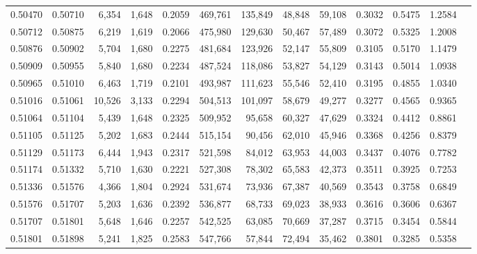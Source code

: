 \begin{tabular}{rrrrrrrrrrrrr}
0.50470 & 0.50710 &  6,354 & 1,648 &                                     0.2059 & 469,761 & 135,849 &  48,848 &  59,108 & 0.3032 & 0.5475 & 1.2584 \\
0.50712 & 0.50875 &  6,219 & 1,619 &                                     0.2066 & 475,980 & 129,630 &  50,467 &  57,489 & 0.3072 & 0.5325 & 1.2008 \\
0.50876 & 0.50902 &  5,704 & 1,680 &                                     0.2275 & 481,684 & 123,926 &  52,147 &  55,809 & 0.3105 & 0.5170 & 1.1479 \\
0.50909 & 0.50955 &  5,840 & 1,680 &                                     0.2234 & 487,524 & 118,086 &  53,827 &  54,129 & 0.3143 & 0.5014 & 1.0938 \\
0.50965 & 0.51010 &  6,463 & 1,719 &                                     0.2101 & 493,987 & 111,623 &  55,546 &  52,410 & 0.3195 & 0.4855 & 1.0340 \\
0.51016 & 0.51061 & 10,526 & 3,133 &                                     0.2294 & 504,513 & 101,097 &  58,679 &  49,277 & 0.3277 & 0.4565 & 0.9365 \\
0.51064 & 0.51104 &  5,439 & 1,648 &                                     0.2325 & 509,952 &  95,658 &  60,327 &  47,629 & 0.3324 & 0.4412 & 0.8861 \\
0.51105 & 0.51125 &  5,202 & 1,683 &                                     0.2444 & 515,154 &  90,456 &  62,010 &  45,946 & 0.3368 & 0.4256 & 0.8379 \\
0.51129 & 0.51173 &  6,444 & 1,943 &                                     0.2317 & 521,598 &  84,012 &  63,953 &  44,003 & 0.3437 & 0.4076 & 0.7782 \\
0.51174 & 0.51332 &  5,710 & 1,630 &                                     0.2221 & 527,308 &  78,302 &  65,583 &  42,373 & 0.3511 & 0.3925 & 0.7253 \\
0.51336 & 0.51576 &  4,366 & 1,804 &                                     0.2924 & 531,674 &  73,936 &  67,387 &  40,569 & 0.3543 & 0.3758 & 0.6849 \\
0.51576 & 0.51707 &  5,203 & 1,636 &                                     0.2392 & 536,877 &  68,733 &  69,023 &  38,933 & 0.3616 & 0.3606 & 0.6367 \\
0.51707 & 0.51801 &  5,648 & 1,646 &                                     0.2257 & 542,525 &  63,085 &  70,669 &  37,287 & 0.3715 & 0.3454 & 0.5844 \\
0.51801 & 0.51898 &  5,241 & 1,825 &                                     0.2583 & 547,766 &  57,844 &  72,494 &  35,462 & 0.3801 & 0.3285 & 0.5358 \\

\end{tabular}
